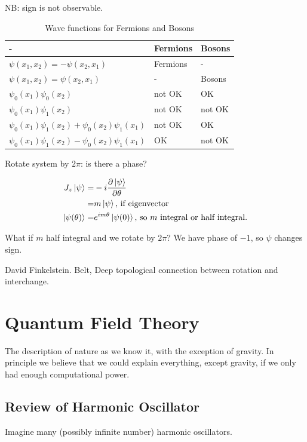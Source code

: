 \documentclass[]{article}
\begin{document}
NB: sign is not observable.

\begin{table}[H]
	\begin{center}
		\caption{Wave functions for Fermions and Bosons}
			\begin{tabular}{|l| l| l|} \hline 
				-&Fermions&Bosons \\ \hline 
				$\psi(x_1,x_2)=-\psi(x_2,x_1)$&Fermions&-\\ \hline
				$\psi(x_1,x_2)=\psi(x_2,x_1)$&-& Bosons\\ \hline
				$\psi_0(x_1)\psi_0(x_2)$&not OK& OK\\ \hline
				$\psi_0(x_1)\psi_1(x_2)$&not OK& not OK\\ \hline
				$\psi_0(x_1)\psi_1(x_2)+\psi_0(x_2)\psi_1(x_1)$&not OK& OK\\ \hline
				$\psi_0(x_1)\psi_1(x_2)-\psi_0(x_2)\psi_1(x_1)$&OK&not OK \\ \hline
			\hline
		\end{tabular}
	\end{center}
\end{table}


Rotate system by $2\pi$: is there a phase?

\begin{align*}
J_z\ket{\psi} =& -i \frac{\partial \ket{\psi}}{\partial \theta}\\
=& m\ket{\psi} \text{, if eigenvector}\\
\ket{\psi(\theta)} =& e^{im\theta}\ket{\psi(0)}\text{, so $m$ integral or half integral.}
\end{align*}

What if $m$ half integral and we rotate by $2\pi$? We have phase of $-1$, so $\psi$ changes sign.

David Finkelstein. Belt, Deep topological connection between rotation and interchange.

\section{Quantum Field Theory}

The description of nature as we know it, with the exception of gravity. In principle we believe that we could explain everything, except gravity, if we only had enough computational power.

\subsection{Review of Harmonic Oscillator}
Imagine many (possibly infinite number) harmonic oscillators.
\end{document}
